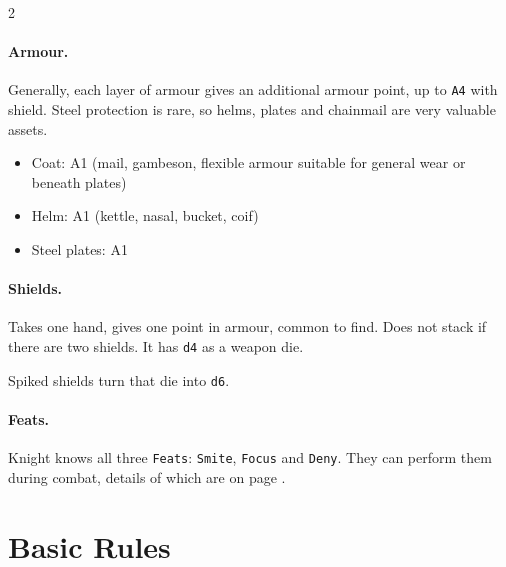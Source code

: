 \documentclass{osr-template/zine}
\begin{document}
\begin{multicols*}{2}
\paragraph{Armour.} Generally, each layer of armour gives an additional armour point, up to \texttt{A4} with shield.
Steel protection is rare, so helms, plates and chainmail are very valuable assets.
\begin{itemize}[nosep, leftmargin=*]
    \item[] Coat: A1 (mail, gambeson, flexible armour suitable for general wear or beneath plates)
    \item[] Helm: A1 (kettle, nasal, bucket, coif)
    \item[] Steel plates: A1 
\end{itemize}

\paragraph{Shields.} Takes one hand, gives one point in armour, common to find.
Does not stack if there are two shields. It has \texttt{d4} as a weapon die.

Spiked shields turn that die into \texttt{d6}.

\paragraph{Feats. } Knight knows all three \texttt{Feats}: \texttt{Smite}, \texttt{Focus} and \texttt{Deny}. 
They can perform them during combat, details of which are on page \pageref*{sec:combat}.


\end{multicols*}

\newpage
\section*{\centering \fontsize{35}{45}\selectfont \fontsize{35}{45}\selectfont Basic Rules}
\vspace*{0.4 cm}
\end{document}
